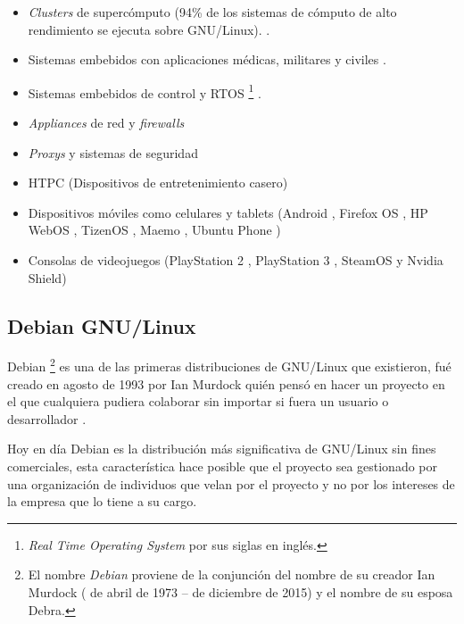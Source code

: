 \newpage
\begin{itemize}
  \item \textit{Clusters} de superc\'{o}mputo (94\% de los sistemas de c\'{o}mputo de alto rendimiento se ejecuta sobre GNU/Linux). \cite{_tic_????}\cite{_94_????}.
  \item Sistemas embebidos con aplicaciones m\'{e}dicas, militares y civiles \cite{_elinux.org_????}\cite{_rtos_????}.
  \item Sistemas embebidos de control y \textsc{RTOS} \footnote{\textit{Real Time Operating System} por sus siglas en ingl\'{e}s.} \cite{_uclinux_????}\cite{_rtos_????}.
  \item \textit{Appliances} de red y \textit{firewalls} \cite{_router/bridge_????}\cite{_endian_????}
  \item \textit{Proxys} y sistemas de seguridad \cite{_f5_????}\cite{_junos_????}\cite{_infoblox_????}
  \item \textsc{HTPC} (Dispositivos de entretenimiento casero) \cite{_openelec_????}
  \item Dispositivos m\'{o}viles como celulares y tablets (Android \cite{_android_????}, Firefox OS \cite{_firefox_????}, HP WebOS \cite{_hp_????}, TizenOS \cite{_tizen_????}, Maemo \cite{_maemo.org_????}, Ubuntu Phone \cite{_ubuntu_????})
  \item Consolas de videojuegos (PlayStation 2 \cite{_ps2_????}, PlayStation 3 \cite{_open_????}, SteamOS y Nvidia Shield)
\end{itemize}

  \subsection {Debian GNU/Linux}

Debian \footnote{El nombre \textit{Debian} proviene de la conjunci\'{o}n del nombre de su creador Ian Murdock (  de abril de 1973 –  de diciembre de 2015) y el nombre de su esposa Debra.} es una de las primeras distribuciones de GNU/Linux que existieron, fu\'{e} creado en agosto de 1993 por Ian Murdock qui\'{e}n pens\'{o} en hacer un proyecto en el que cualquiera pudiera colaborar sin importar si fuera un usuario o desarrollador \cite{_debian_????}.

Hoy en d\'{i}a Debian es la distribuci\'{o}n m\'{a}s significativa de GNU/Linux sin fines comerciales, esta caracter\'{i}stica hace posible que el proyecto sea gestionado por una organizaci\'{o}n de individuos que velan por el proyecto y no por los intereses de la empresa que lo tiene a su cargo.


